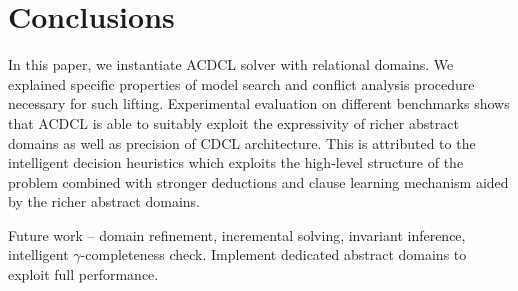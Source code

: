 \section{Conclusions}
In this paper, we instantiate ACDCL solver with relational domains.  We explained specific properties of model search and conflict analysis procedure necessary
for such lifting.  Experimental evaluation on different benchmarks shows that
ACDCL is able to suitably exploit the expressivity of richer
abstract domains as well as precision of CDCL architecture.
This is attributed to the intelligent decision heuristics
which exploits the high-level structure of the problem
combined with stronger deductions and clause learning
mechanism aided by the richer abstract domains.

Future work -- domain refinement, incremental solving, invariant inference, intelligent $\gamma$-completeness check. Implement dedicated abstract domains to exploit full performance.
